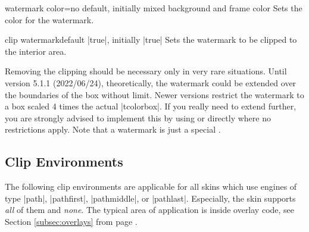 \begin{docTcbKey}{watermark color}{=}{no default, initially mixed background and frame color}
  Sets the color for the watermark.
\begin{dispExample}

\begin{tcolorbox}[enhanced,title=My title,watermark text=My Watermark,
  watermark color=yellow!50!red]
\lipsum[1]
\end{tcolorbox}
\end{dispExample}
\end{docTcbKey}

\clearpage

\begin{docTcbKey}{clip watermark}{}{default |true|, initially |true|}
  Sets the watermark to be clipped to the interior area.
\begin{dispExample}

\begin{tcolorbox}[title=Clip (default),clip watermark]
\lipsum[1]
\end{tcolorbox}

\begin{tcolorbox}[title=No clip,clip watermark=false]
\lipsum[1]
\end{tcolorbox}%
\end{dispExample}
\end{docTcbKey}

\begin{marker}
Removing the clipping should be necessary only in very rare situations. Until
version 5.1.1 (2022/06/24), theoretically, the watermark could be extended
over the boundaries of the box without limit. Newer versions restrict the
watermark to a box scaled 4 times the actual |tcolorbox|.
If you really need to extend further, you are strongly advised to implement
this by using  or  directly
where no restrictions apply.
Note that a watermark is just a special .
\end{marker}


\clearpage
\subsection{Clip Environments}\label{subsec:clipping}
The following clip environments are applicable for all skins which
use engines of type |path|, |pathfirst|, |pathmiddle|, or |pathlast|.
Especially, the skin  supports \emph{all} of them
and  \emph{none}. The typical area of application
is inside overlay code, see Section \ref{subsec:overlays} from
page \pageref{subsec:overlays}.



